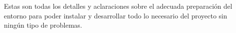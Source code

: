 \documentclass[a4paper, 12pt]{book}
\begin{document}
Estas son todas los detalles y aclaraciones sobre el adecuada preparación del entorno para poder instalar y desarrollar todo lo necesario del proyecto sin ningún tipo de problemas.


\glsaddall
\printglossary[type=\acronymtype,nonumberlist]

\printglossary[nonumberlist]





\cleardoublepage

%
% 

\raggedright\printbibliography[heading=bibintoc,title={Referencias}]
\end{document}
